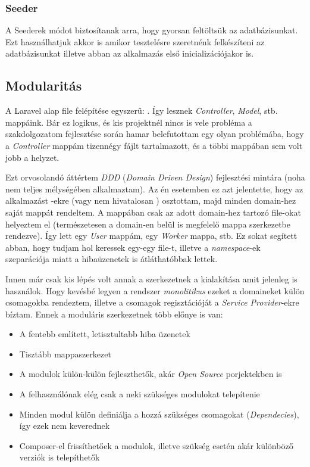 \documentclass[a4paper,12pt]{thesis-ekf}
\theoremstyle{definition}
\begin{document}
				\subsubsection{Seeder}\label{sssc-db_seeder}
					A Seederek módot biztosítanak arra, hogy gyorsan feltöltsük az adatbázisunkat. Ezt használhatjuk akkor is amikor tesztelésre szeretnénk felkészíteni az adatbázisunkat illetve abban az alkalmazás első inicializációjakor is.
					
			\subsection{Modularitás}
				A Laravel alap file felépítése egyszerű: . Így lesznek \emph{Controller}, \emph{Model}, stb. mappáink. Bár ez logikus, és kis projektnél nincs is vele probléma a szakdolgozatom fejlesztése során hamar belefutottam egy olyan problémába, hogy a \emph{Controller} mappám tizennégy fájlt tartalmazott, és a többi mappában sem volt jobb a helyzet. 
				
				Ezt orvosolandó áttértem \emph{DDD} (\emph{Domain Driven Design}) fejlesztési mintára (noha nem teljes mélységében alkalmaztam). Az én esetemben ez azt jelentette, hogy az alkalmazást -ekre (vagy nem hivatalosan ) osztottam, majd minden domain-hez saját mappát rendeltem. A mappában csak az adott domain-hez tartozó file-okat helyeztem el (természetesen a domain-en belül is megfelelő mappa szerkezetbe rendezve). Így lett egy \emph{User} mappám, egy \emph{Worker} mappa, stb. Ez sokat segített abban, hogy tudjam hol keressek egy-egy file-t, illetve a \emph{namespace}-ek szeparációja miatt a hibaüzenetek is átláthatóbbak lettek.

				Innen már csak kis lépés volt annak a szerkezetnek a kialakítása amit jelenleg is használok. Hogy kevésbé legyen a rendszer \emph{monolitikus} ezeket a domaineket külön csomagokba rendeztem, illetve a csomagok regisztációját a \emph{Service Provider}-ekre bíztam. Ennek a moduláris szerkezetnek több előnye is van:
				\begin{itemize}
					\item A fentebb említett, letisztultabb hiba üzenetek
					\item Tisztább mappaszerkezet
					\item A modulok külön-külön fejleszthetők, akár \emph{Open Source} porjektekben is
					\item A felhasználónak elég csak a neki szükséges modulokat telepítenie
					\item Minden modul külön definiálja a hozzá szükséges csomagokat (\emph{Dependecies}), így ezek nem keverednek
					\item Composer-el frissíthetőek a modulok, illetve szükség esetén akár különböző verziók is telepíthetők
				\end{itemize}			
			
\end{document}

